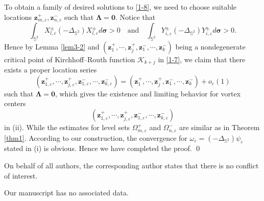 \documentclass[12pt,reqno]{amsart}
\numberwithin{equation}{section}
\theoremstyle{definition}
\theoremstyle{remark}
\begin{document}
     To obtain a family of desired solutions to \eqref{1-8}, we need to choose suitable locations $\boldsymbol z_{m,\varepsilon}^+, \boldsymbol z_{n,\varepsilon}^-$ such that $\mathbf \Lambda=\boldsymbol 0$. Notice that 
    \begin{equation*}
    	\int_{\mathbb S^2} X_{l,\varepsilon}^\pm(-\Delta_{\mathbb S^2})X_{l,\varepsilon}^\pm d\boldsymbol \sigma>0 \quad \mathrm{and} \quad \int_{\mathbb S^2} Y_{i,\varepsilon}^\pm(-\Delta_{\mathbb S^2})Y_{i,\varepsilon}^\pm d\boldsymbol \sigma>0.
    \end{equation*} 
    Hence by Lemma \ref{lem3-2} and $(\boldsymbol z_1^+,\cdots,\boldsymbol z_j^+, \boldsymbol z_1^-,\cdots, \boldsymbol z_k^-)$ being a nondegenerate critical point of Kirchhoff--Routh function $\mathcal K_{k+j}$ in \eqref{1-7}, we claim that there exists a proper location series
    \begin{equation*}
    	\left(\boldsymbol z_{1,\varepsilon}^+,\cdots,\boldsymbol z_{j,\varepsilon}^+, \boldsymbol z_{1,\varepsilon}^-,\cdots, \boldsymbol z_{k,\varepsilon}^-\right)= \left(\boldsymbol z_1^+,\cdots,\boldsymbol z_j^+, \boldsymbol z_1^-,\cdots, \boldsymbol z_k^-\right)+o_\varepsilon(1)
    \end{equation*}
    such that $\mathbf \Lambda=\boldsymbol 0$, which gives the existence and limiting behavior for vortex centers 
    $$(\boldsymbol z_{1,\varepsilon}^+,\cdots,\boldsymbol z_{j,\varepsilon}^+, \boldsymbol z_{1,\varepsilon}^-,\cdots, \boldsymbol z_{k,\varepsilon}^-)$$
    in (ii). While the estimates for level sets $\Omega_{m,\varepsilon}^+$ and $\Omega_{n,\varepsilon}^-$ are similar as in Theorem \ref{thm1}. According to our construction, the convergence for $\omega_\varepsilon=(-\Delta_{\mathbb S^2})\psi_\varepsilon$ stated in (i) is obvious. Hence we have completed the proof.	\qed
    
    \bigskip
    
     On behalf of all authors, the corresponding author states that there is no conflict of interest.
    
    \bigskip
    
     Our manuscript has no associated data.
    
    \bigskip
    
	\phantom{s}
	\thispagestyle{empty}
\end{document}
